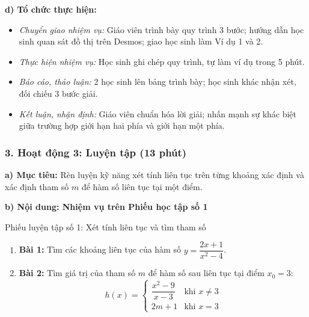 \documentclass[12pt, a4paper]{article}
\begin{document}
\noindent \textbf{d) Tổ chức thực hiện:}
\begin{itemize}[leftmargin=0.8cm]
    \item \textit{Chuyển giao nhiệm vụ:} Giáo viên trình bày quy trình 3 bước; hướng dẫn học sinh quan sát đồ thị trên Desmos; giao học sinh làm Ví dụ 1 và 2.
    \item \textit{Thực hiện nhiệm vụ:} Học sinh ghi chép quy trình, tự làm ví dụ trong 5 phút.
    \item \textit{Báo cáo, thảo luận:} 2 học sinh lên bảng trình bày; học sinh khác nhận xét, đối chiếu 3 bước giải.
    \item \textit{Kết luận, nhận định:} Giáo viên chuẩn hóa lời giải; nhấn mạnh sự khác biệt giữa trường hợp giới hạn hai phía và giới hạn một phía.
\end{itemize}

\subsubsection*{3. Hoạt động 3: Luyện tập (13 phút)}

\noindent \textbf{a) Mục tiêu:}
Rèn luyện kỹ năng xét tính liên tục trên từng khoảng xác định và xác định tham số $m$ để hàm số liên tục tại một điểm.

\noindent \textbf{b) Nội dung: Nhiệm vụ trên Phiếu học tập số 1}
\begin{pedabox}{Phiếu luyện tập số 1: Xét tính liên tục và tìm tham số}
\begin{enumerate}[leftmargin=0.6cm]
    \item \textbf{Bài 1:} Tìm các khoảng liên tục của hàm số $y = \dfrac{2x + 1}{x^2 - 4}$.
    \item \textbf{Bài 2:} Tìm giá trị của tham số $m$ để hàm số sau liên tục tại điểm $x_0 = 3$:
    $$h(x) = \begin{cases} \dfrac{x^2 - 9}{x - 3} & \text{khi } x \neq 3 \\ 2m + 1 & \text{khi } x = 3 \end{cases}$$
\end{enumerate}
\end{pedabox}
\end{document}
